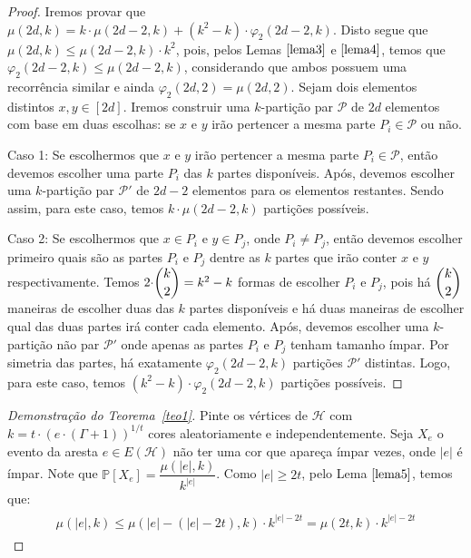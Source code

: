 \documentclass[12pt]{article}
\begin{document}
{\begin{proof}
	Iremos provar que $\mu(2d, k) = k {\cdot} \mu(2d - 2, k) + (k^2 - k) {\cdot} \varphi_2(2d - 2, k)$. Disto segue que $\mu(2d, k) \leq \mu(2d - 2, k) {\cdot} k^{2}$, pois, pelos Lemas $\ref{lema3}$ e $\ref{lema4}$, temos que $\varphi_2(2d - 2, k) \leq \mu(2d - 2, k)$, considerando que ambos possuem uma recorrência similar e ainda $\varphi_2(2d, 2) = \mu(2d, 2)$. Sejam dois elementos distintos $x, y \in [2d]$. Iremos construir uma $k$-partição par $\mathcal{P}$ de $2d$ elementos com base em duas escolhas: se $x$ e $y$ irão pertencer a mesma parte $P_i \in \mathcal{P}$ ou não. \newl
	
	Caso 1: Se escolhermos que $x$ e $y$ irão pertencer a mesma parte $P_i \in \mathcal{P}$, então devemos escolher uma parte $P_i$ das $k$ partes disponíveis. Após, devemos escolher uma $k$-partição par $\mathcal{P'}$ de $2d - 2$ elementos para os elementos restantes. Sendo assim, para este caso, temos $k {\cdot} \mu(2d - 2, k)$ partições possíveis. \newl 
	
	Caso 2: Se escolhermos que $x \in P_i$ e $y \in P_j$, onde $P_i \neq P_j$, então devemos escolher primeiro quais são as partes $P_i$ e $P_j$ dentre as $k$ partes que irão conter $x$ e $y$ respectivamente. Temos $2 {\cdot} \escolhe{k}{2} = k^2 - k$ formas de escolher $P_i$ e $P_j$, pois há $\escolhe{k}{2}$ maneiras de escolher duas das $k$ partes disponíveis e há duas maneiras de escolher qual das duas partes irá conter cada elemento. Após, devemos escolher uma $k$-partição não par $\mathcal{P'}$ onde apenas as partes $P_i$ e $P_j$ tenham tamanho ímpar. Por simetria das partes, há exatamente $\varphi_2(2d - 2, k)$ partições $\mathcal{P'}$ distintas. Logo, para este caso, temos $(k^2 - k) {\cdot} \varphi_2(2d - 2, k)$ partições possíveis.
	
	
\end{proof} \newl

 
\begin{proof}[Demonstração do Teorema~\ref{teo1}]
	Pinte os vértices de $\mathcal{H}$ com $k = t {\cdot} (e {\cdot} (\Gamma + 1))^{1/t}$ cores aleatoriamente e independentemente. Seja $X_{e}$ o evento da aresta $e \in E(\mathcal{H})$ não ter uma cor que apareça ímpar vezes, onde $|e|$ é ímpar. Note que $\mathds{P}[X_{e}] = \dfrac{\mu(|e|, k)}{k^{|e|}}$. Como $|e| \geq 2t$, pelo Lema $\ref{lema5}$, temos que: 
	\begin{align}
		\begin{split}
			\mu(|e|, k) \leq \mu(|e| - (|e| - 2t), k) {\cdot} k^{|e| - 2t} = \mu(2t, k) {\cdot} k^{|e| - 2t}
		\end{split} 
	\end{align} 


\end{proof}}
\end{document}
